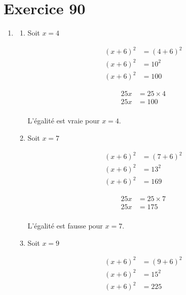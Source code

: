 \documentclass[12pt,a4paper]{article}
\begin{document}
\section*{Exercice 90}

	\begin{enumerate}[label=\arabic*)]
		\item 
	
	\begin{enumerate}[label=\alph*)]
		\item Soit $x=4$
		
		\begin{multicols}{2}
			\begin{align*}
				(x + 6)^2 &= (4 + 6)^2\\ 
				(x + 6)^2 &= 10^2\\ 
				(x + 6)^2 &= 100
			\end{align*}
			
			\begin{align*}
				25x &= 25 \times 4\\ 
				25x &= 100\\
			\end{align*}
		\end{multicols}
		
		L'égalité est vraie pour $x=4$.
		\item Soit $x=7$
		
		\begin{multicols}{2}
			\begin{align*}
				(x + 6)^2 &= (7 + 6)^2\\ 
				(x + 6)^2 &= 13^2\\ 
				(x + 6)^2 &= 169
			\end{align*}
			
			\begin{align*}
				25x &= 25 \times 7\\ 
				25x &= 175\\
			\end{align*}
		\end{multicols}
		
		L'égalité est fausse pour $x=7$.
		\item Soit $x=9$
		
		\begin{multicols}{2}
			\begin{align*}
				(x + 6)^2 &= (9 + 6)^2\\ 
				(x + 6)^2 &= 15^2\\ 
				(x + 6)^2 &= 225
			\end{align*}
			

\end{multicols}
\end{enumerate}
\end{enumerate}
\end{document}
